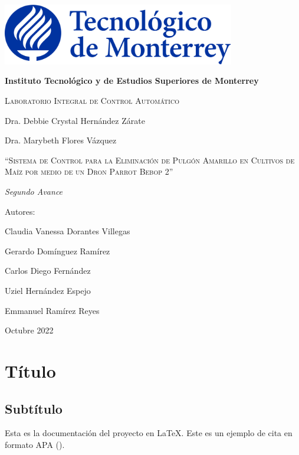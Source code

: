 \documentclass[11pt]{exam}
\begin{document}
    \begin{titlepage}
        \centering
        {\includegraphics[width = 4in]{pictures/itesm-logo.png}\par}
        \vspace{0.4in}
        {\bfseries\LARGE Instituto Tecnol\'ogico y de Estudios Superiores de Monterrey \par}
        \vspace{0.4in}
        {\scshape\Large Laboratorio Integral de Control Automático \par}
        {\Large Dra. Debbie Crystal Hernández Zárate \par}
        {\Large Dra. Marybeth Flores Vázquez \par}
        \vspace{1.2in}
        {\scshape\Large ``Sistema de Control para la Eliminaci\'on de Pulg\'on Amarillo en Cultivos de Maíz por medio de un Dron Parrot Bebop 2'' \par}
        \vspace{1.2in}
        {\itshape\Large Segundo Avance \par}
        \vfill
        {\Large Autores: \par}
        {\Large Claudia Vanessa Dorantes Villegas\par}
        {\Large Gerardo Dom\'inguez Ram\'irez\par}
        {\Large Carlos Diego Fernández\par}
        {\Large Uziel Hernández Espejo\par}
        {\Large Emmanuel Ramírez Reyes\par}
        \vfill
        {\Large Octubre 2022 \par}
    \end{titlepage}

    \headrule
    \footrule

    \section*{T\'itulo}
        \subsection*{Subt\'itulo}
        Esta es la documentación del proyecto en {\LaTeX}. Este es un ejemplo de cita en formato APA (\cite{tenorio-2018}).
\end{document}
